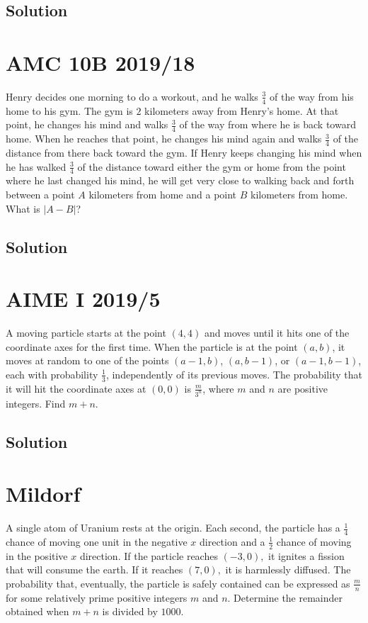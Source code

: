 \documentclass[blue,onecol]{shooting}
\begin{document}
\subsection{Solution}





\section{AMC 10B 2019/18} Henry decides one morning to do a workout, and he walks $\tfrac{3}{4}$ of the way from his home to his gym. The gym is $2$ kilometers away from Henry's home. At that point, he changes his mind and walks $\tfrac{3}{4}$ of the way from where he is back toward home. When he reaches that point, he changes his mind again and walks $\tfrac{3}{4}$ of the distance from there back toward the gym. If Henry keeps changing his mind when he has walked $\tfrac{3}{4}$ of the distance toward either the gym or home from the point where he last changed his mind, he will get very close to walking back and forth between a point $A$ kilometers from home and a point $B$ kilometers from home. What is $|A-B|$?
\subsection{Solution}    




\section{AIME I 2019/5} A moving particle starts at the point $(4,4)$ and moves until it hits one of the coordinate axes for the first time. When the particle is at the point $(a,b)$, it moves at random to one of the points $(a-1,b)$, $(a,b-1)$, or $(a-1,b-1)$, each with probability $\tfrac{1}{3}$, independently of its previous moves. The probability that it will hit the coordinate axes at $(0,0)$ is $\tfrac{m}{3^n}$, where $m$ and $n$ are positive integers. Find $m + n$.
\subsection{Solution}





\section{Mildorf} A single atom of Uranium rests at the origin. Each second, the particle has a $\frac{1}{4}$ chance of moving one unit in the negative $x$ direction and a $\frac{1}{2}$ chance of moving in the positive $x$ direction. If the particle reaches $(-3,0),$ it ignites a fission that will consume the earth. If it reaches $(7,0),$ it is harmlessly diffused. The probability that, eventually, the particle is safely contained can be expressed as $\frac{m}{n}$ for some relatively prime positive integers $m$ and $n.$ Determine the remainder obtained when $m+n$ is divided by $1000.$
\end{document}

